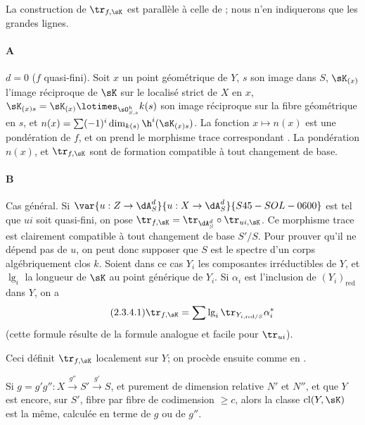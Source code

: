 \subsubsection{}\label{IV:2-3-4}

La construction de $\tr_{f,\sK}$ est parallèle à celle de 
; nous n'en indiquerons que les grandes lignes.

\paragraph{A}
$d=0$ ($f$ quasi-fini). Soit $x$ un point géométrique de $Y$, $s$ son image 
dans $S$, $\sK_{(x)}$ l'image réciproque de $\sK$ sur le localisé strict 
de $X$ en $x$, $\sK_{(x)s} = \sK_{(x)}\lotimes_{\sO_{S,s}^h} k(s)$ son image 
réciproque sur la fibre géométrique en $s$, et 
$n(x)=\sum (-1)^i \dim_{k(s)} \h^i(\sK_{(x)s})$. La fonction $x\mapsto n(x)$ 
est une pondération de $f$, et on prend le morphisme trace correspondant 
\cite[XVII.6.2.5]{sga4}. La pondération $n(x)$, et $\tr_{f,\sK}$ sont de 
formation compatible à tout changement de base. 

\paragraph{B}
Cas général. Si $\var{u:Z\to \dA_S^d}{u:X\to \dA_S^d}{S45-SOL-0600}$ est tel que $u i$ soit quasi-fini, on pose 
$\tr_{f,\sK} = \tr_{\dA_S^d}\circ \tr_{u i,\sK}$. Ce morphisme trace est 
clairement compatible à tout changement de base $S'/S$. Pour prouver qu'il ne 
dépend pas de $u$, on peut donc supposer que $S$ est le spectre d'un corps 
algébriquement clos $k$. Soient dans ce cas $Y_i$ les composantes 
irréductibles de $Y$, et $\operatorname{lg}_i$ la longueur de $\sK$ au 
point générique de $Y_i$. Si $\alpha_i$ est l'inclusion de 
$(Y_i)_\text{red}$ dans $Y$, on a 
\begin{equation*}\tag{2.3.4.1}\label{IV:eq:2-3-4}
  \tr_{f,\sK} = \sum \operatorname{lg}_i \tr_{Y_{i,\text{red}/S}} \alpha_i^\ast
\end{equation*}
(cette formule résulte de la formule analogue et facile pour $\tr_{u i}$). 

Ceci définit $\tr_{f,\sK}$ localement sur $Y$; on procède ensuite comme en 
\cite[XVIII.2.9]{sga4}. 





\begin{lemma}\label{IV:2-3-5}
Si $g=g'g'':X\xrightarrow{g''} S'\xrightarrow{g'} S$,  
et purement de dimension relative $N'$ et $N''$, et que $Y$ est encore, sur 
$S'$, fibre par fibre de codimension $\geqslant c$, alors la classe 
$\operatorname{cl}(Y,\sK)$ est la même, calculée en terme de $g$ ou de 
$g''$.
\end{lemma}

